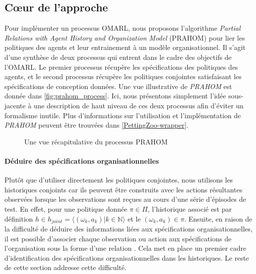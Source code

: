 \documentclass[contribution]{jfsma}
\newcounter{relation}
\begin{document}
\subsection{Cœur de l'approche}

Pour implémenter un processus OMARL, nous proposons l'algorithme \emph{Partial Relations with Agent History and Organization Model} (PRAHOM) pour lier les politiques des agents et leur entrainement à un modèle organisationnel.
Il s'agit d'une synthèse de deux processus qui entrent dans le cadre des objectifs de l'OMARL. Le premier processus récupère les spécifications des politiques des agents, et le second processus récupère les politiques conjointes satisfaisant les spécifications de conception données. Une vue illustrative de \emph{PRAHOM} est donnée dans \autoref{fig:prahom_process}.
Ici, nous présentons simplement l'idée sous-jacente à une description de haut niveau de ces deux processus afin d'éviter un formalisme inutile. Plus d'informations sur l'utilisation et l'implémentation de \emph{PRAHOM} peuvent être trouvées dans \autoref{PettingZoo-wrapper}.

\begin{figure}[h!]
  \centering
  
  \caption{Une vue récapitulative du processus PRAHOM}
  \label{fig:prahom_process}
\end{figure}

\paragraph{\textbf{Déduire des spécifications organisationnelles}}

Plutôt que d'utiliser directement les politiques conjointes, nous utilisons les historiques conjoints car ils peuvent être construits avec les actions résultantes observées lorsque les observations sont reçues au cours d'une série d'épisodes de test. En effet, pour une politique donnée $\pi \in \Pi$, l'historique associé est par définition $h \in h_{joint} = \langle(\omega_k,a_k) | k \in \mathbb{N}\rangle$ et le $(\omega_k,a_k) \in \pi$.
Ensuite, en raison de la difficulté de déduire des informations liées aux spécifications organisationnelles, il est possible d'associer chaque observation ou action aux spécifications de l'organisation sous la forme d'une relation . Cela met en place un premier cadre d’identification des spécifications organisationnelles dans les historiques. Le reste de cette section addresse cette difficulté.
\end{document}
